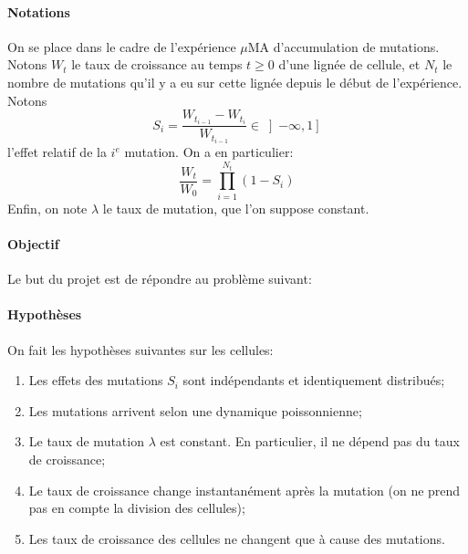 \documentclass[12pt]{article}
\newcommand{\iof}[1]{\left]#1\right]}
\begin{document}
\paragraph{Notations}
On se place dans le cadre de l'expérience $\mu$MA d'accumulation de mutations. Notons $W_t$ le taux de croissance au temps $t\geqslant 0$ d'une lignée de cellule, et $N_t$ le nombre de mutations qu'il y a eu sur cette lignée depuis le début de l'expérience. Notons \[S_i=\frac{W_{t_{i-1}}-W_{t_i}}{W_{t_{i-1}}}\in\iof{-\infty,1}\] l'effet relatif de la $i^e$ mutation. On a en particulier: 
\begin{equation}\label{mod}
  \frac{W_t}{W_0}=\prod_{i=1}^{N_t}(1-S_i)
\end{equation}
Enfin, on note $\lambda$ le taux de mutation, que l'on suppose constant.

\paragraph{Objectif} Le but du projet est de répondre au problème suivant:
\vspace{5mm}



\paragraph{Hypothèses}
On fait les hypothèses suivantes sur les cellules:
\begin{enumerate}
\item Les effets des mutations $S_i$ sont indépendants et identiquement distribués;
\item Les mutations arrivent selon une dynamique poissonnienne;
\item Le taux de mutation $\lambda$ est constant. En particulier, il ne dépend pas du taux de croissance;
\item Le taux de croissance change instantanément après la mutation (on ne prend pas en compte la division des cellules);
\item Les taux de croissance des cellules ne changent que à cause des mutations.
\end{enumerate}
\end{document}
